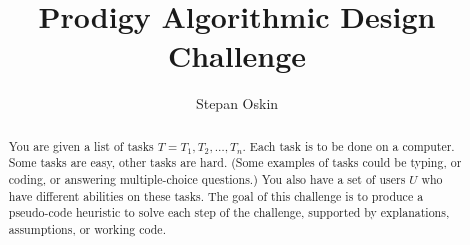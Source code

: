 \documentclass[11pt]{report}
\begin{document}
    \title{Prodigy Algorithmic Design Challenge}

    \author{Stepan Oskin}

    \maketitle

    \begin{abstract}

        You are given a list of tasks $T = T_1, T_2, \dots, T_n$.
        Each task is to be done on a computer.
        Some tasks are easy, other tasks are hard.
        (Some examples of tasks could be typing, or coding, or answering multiple-choice questions.)
        You also have a set of users $U$ who have different abilities on these tasks.
        The goal of this challenge is to produce a pseudo-code heuristic to solve each step of the challenge, supported by explanations, assumptions, or working code.

    \end{abstract}

    
    
    

    \medskip
    
    
\end{document}
